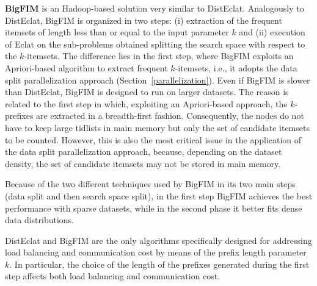 \documentclass[preprint,review,12pt]{elsarticle}
\begin{document}
{\bf BigFIM} is an Hadoop-based solution very similar to DistEclat. 
Analogously to DistEclat, BigFIM is organized in two steps: (i) extraction of the frequent itemsets 
of length less than or equal to the input parameter $k$ and (ii) execution of Eclat on the sub-problems obtained splitting the search space with respect 
to the $k$-itemsets. The difference lies in the first step, where BigFIM exploits an Apriori-based algorithm to extract frequent $k$-itemsets, i.e., it adopts the data split parallelization approach (Section~\ref{parallelization}). 
Even if BigFIM is slower than DistEclat, BigFIM is designed to run on larger datasets.
The reason is related to the first step in which, exploiting an Apriori-based approach,
the $k$-prefixes are extracted in a breadth-first fashion.  Consequently, the nodes do not have to keep large tidlists in main memory but only the set of candidate itemsets to be counted. However, this is also the most critical issue in the application of the data split parallelization approach, because, depending on the dataset density, the set of candidate itemsets may not be stored in main memory. 

Because of the two different techniques used by BigFIM in its two main steps (data split and then search space split), 
in the first step BigFIM achieves the best performance with sparse datasets, while in the second phase it better fits dense data distributions.

DistEclat and BigFIM are the only algorithms specifically designed for addressing 
load balancing and communication cost by means of the prefix length parameter $k$. 
In particular, the choice of the length of the prefixes
generated during the first step affects both load
balancing and communication cost. 
\end{document}
